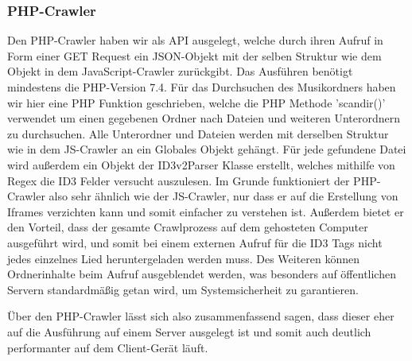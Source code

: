\documentclass{article}
\begin{document}
\subsubsection{PHP-Crawler}
Den PHP-Crawler haben wir als API ausgelegt, welche durch ihren Aufruf in Form einer GET Request ein JSON-Objekt mit der selben Struktur wie dem Objekt in dem JavaScript-Crawler zurückgibt. Das Ausführen benötigt mindestens die PHP-Version 7.4. Für das Durchsuchen des Musikordners haben wir hier eine PHP Funktion geschrieben, welche die PHP Methode 'scandir()' verwendet um einen gegebenen Ordner nach Dateien und weiteren Unterordnern zu durchsuchen. Alle Unterordner und Dateien werden mit derselben Struktur wie in dem JS-Crawler an ein Globales Objekt gehängt. Für jede gefundene Datei wird außerdem ein Objekt der ID3v2Parser Klasse erstellt, welches mithilfe von Regex die ID3 Felder versucht auszulesen.
Im Grunde funktioniert der PHP-Crawler also sehr ähnlich wie der JS-Crawler, nur dass er auf die Erstellung von Iframes verzichten kann und somit einfacher zu verstehen ist. Außerdem bietet er den Vorteil, dass der gesamte Crawlprozess auf dem gehosteten Computer ausgeführt wird, und somit bei einem externen Aufruf für die ID3 Tags nicht jedes einzelnes Lied heruntergeladen werden muss. Des Weiteren können Ordnerinhalte beim Aufruf ausgeblendet werden, was besonders auf öffentlichen Servern standardmäßig getan wird, um Systemsicherheit zu garantieren.\newline

\noindent Über den PHP-Crawler lässt sich also zusammenfassend sagen, dass dieser eher auf die Ausführung auf einem Server ausgelegt ist und somit auch deutlich performanter auf dem Client-Gerät läuft.
\end{document}

